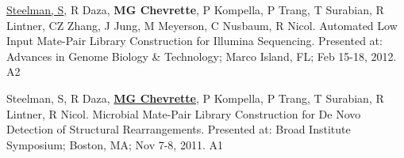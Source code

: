 \begin{cvpubs}
  \cvpub
    {\underline{Steelman, S}, R Daza, \textbf{MG Chevrette}, P Kompella, P Trang, T Surabian, R Lintner, CZ Zhang, J Jung, M Meyerson, C Nusbaum, R Nicol.  Automated Low Input Mate-Pair Library Construction for Illumina Sequencing.  Presented at: Advances in Genome Biology \& Technology; Marco Island, FL; Feb 15-18, 2012.} %
    {A2} %
    
  \cvpub
    {Steelman, S, R Daza, \underline{\textbf{MG Chevrette}}, P Kompella, P Trang, T Surabian, R Lintner, R Nicol.  Microbial Mate-Pair Library Construction for De Novo Detection of Structural Rearrangements.  Presented at: Broad Institute Symposium; Boston, MA; Nov 7-8, 2011.} %
    {A1} %

\end{cvpubs}